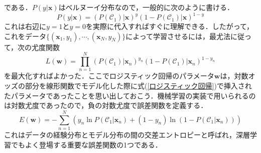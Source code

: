 \documentclass[a4paper,11pt]{jsreport}
\begin{document}
である．$P(y | \bm{x})$はベルヌーイ分布なので，一般的に次のように書ける．
\begin{equation}
  P(y|\bm{x})
  = \left( P(\mathcal{C}_1)|\bm{x} \right)^y \left( 1 - P(\mathcal{C}_1)|\bm{x} \right)^{1 - y}
\end{equation}
これは右辺に$y = 1$と$y = 0$を実際に代入すればすぐに理解できる．したがって，これをデータ$\{ (\bm{x}_1, y_1), \cdots, (\bm{x}_N, y_N) \}$によって学習させるには，最尤法に従って，次の尤度関数
\begin{equation}
  L(\bm{w}) 
  = \prod_{n=1}^N \left( P(\mathcal{C}_1)|\bm{x}_n \right)^{y_n} \left( 1 - P(\mathcal{C}_1)|\bm{x}_n \right)^{1 - y_n}
\end{equation}
を最大化すればよかった．ここでロジスティック回帰のパラメータ$\bm{w}$は，対数オッズの部分を線形関数でモデル化した際に式(\ref{ロジスティック回帰})で挿入されたパラメータであったことを思い出しておこう．機械学習の実装で用いられるのは対数尤度であったので，負の対数尤度で誤差関数を定義する．
\begin{equation}
  E(\bm{w}) 
  = -\sum_{n=1}^{N} \left( y_n \ln{P(\mathcal{C}_1|\bm{x}_n)} + (1 - y_n)\ln{(1 - P(\mathcal{C}_1|\bm{x}_n))} \right)
\end{equation}
これはデータの経験分布とモデル分布の間の交差エントロピーと呼ばれ，深層学習でもよく登場する重要な誤差関数の1つである．
\end{document}
